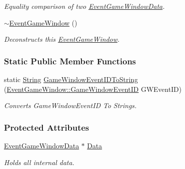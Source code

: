 \begin{DoxyCompactItemize}
\begin{DoxyCompactList}\small\item\em Equality comparison of two \hyperlink{classphys_1_1EventGameWindowData}{EventGameWindowData}. \item\end{DoxyCompactList}\item 
\hypertarget{classphys_1_1EventGameWindow_aa6e0b4f13327caaaab3e4656e6a9fa13}{
\hyperlink{classphys_1_1EventGameWindow_aa6e0b4f13327caaaab3e4656e6a9fa13}{$\sim$EventGameWindow} ()}
\label{classphys_1_1EventGameWindow_aa6e0b4f13327caaaab3e4656e6a9fa13}

\begin{DoxyCompactList}\small\item\em Deconstructs this \hyperlink{classphys_1_1EventGameWindow}{EventGameWindow}. \item\end{DoxyCompactList}\end{DoxyCompactItemize}
\subsubsection*{Static Public Member Functions}
\begin{DoxyCompactItemize}
\item 
static \hyperlink{namespacephys_aa03900411993de7fbfec4789bc1d392e}{String} \hyperlink{classphys_1_1EventGameWindow_a643c70f9137ea6812e53fa0993cd783a}{GameWindowEventIDToString} (\hyperlink{classphys_1_1EventGameWindow_a45225255070513d3cff88cdfea25cc09}{EventGameWindow::GameWindowEventID} GWEventID)
\begin{DoxyCompactList}\small\item\em Converts GameWindowEventID To Strings. \item\end{DoxyCompactList}\end{DoxyCompactItemize}
\subsubsection*{Protected Attributes}
\begin{DoxyCompactItemize}
\item 
\hypertarget{classphys_1_1EventGameWindow_aa5ceefae0b4ef7a017425cbd3ee08600}{
\hyperlink{classphys_1_1EventGameWindowData}{EventGameWindowData} $\ast$ \hyperlink{classphys_1_1EventGameWindow_aa5ceefae0b4ef7a017425cbd3ee08600}{Data}}
\label{classphys_1_1EventGameWindow_aa5ceefae0b4ef7a017425cbd3ee08600}

\begin{DoxyCompactList}\small\item\em Holds all internal data. \item\end{DoxyCompactList}\end{DoxyCompactItemize}


